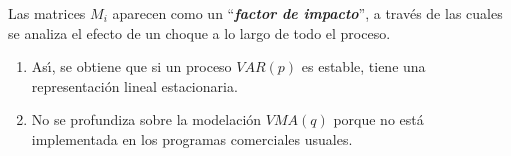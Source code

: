 Las matrices $M_{i}$ aparecen como un ``\textbf{\textit{factor de impacto}}'', a trav\'{e}s de las cuales se analiza el efecto de un choque a lo largo de todo el proceso.

\begin{observacion}
\quad\newline
\begin{enumerate}
      \item As\'{\i}, se obtiene que si un proceso $VAR(p)$ es estable, tiene una representaci\'{o}n lineal estacionaria.
      \item No se profundiza sobre la modelaci\'{o}n $VMA(q)$ porque no est\'{a} implementada en los programas comerciales usuales.
\end{enumerate}
\end{observacion}

